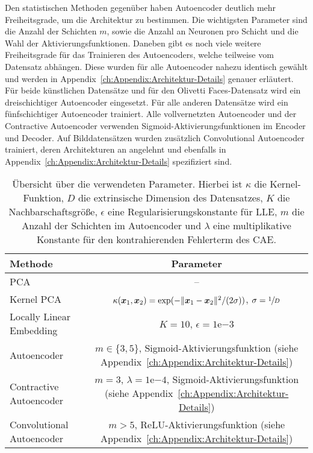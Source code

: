 Den statistischen Methoden gegenüber haben Autoencoder deutlich mehr Freiheitsgrade, um die
Architektur zu bestimmen. Die wichtigsten Parameter sind die Anzahl der Schichten $m$, sowie die
Anzahl an Neuronen pro Schicht und die Wahl der Aktivierungsfunktionen. Daneben gibt es noch viele
weitere Freiheitsgrade für das Trainieren des Autoencoders, welche teilweise vom Datensatz
abhängen. Diese wurden für alle Autoencoder nahezu identisch gewählt und werden in
Appendix~\ref{ch:Appendix:Architektur-Details} genauer erläutert. Für beide künstlichen Datensätze
und für den Olivetti Faces-Datensatz wird ein dreischichtiger
Autoencoder eingesetzt. Für alle anderen Datensätze wird ein fünfschichtiger Autoencoder trainiert.
Alle vollvernetzten Autoencoder und der Contractive Autoencoder verwenden
Sigmoid-Aktivierungsfunktionen im Encoder und Decoder. Auf Bilddatensätzen wurden zusätzlich
Convolutional Autoencoder trainiert, deren Architekturen an \textcite[14]{Ghosh.2019} angelehnt und
ebenfalls in Appendix~\ref{ch:Appendix:Architektur-Details} spezifiziert sind.

\begin{table}[ht]
	\tymax=300pt
	\centering
	\begin{tabulary}{\textwidth}{LC}
		\toprule
		Methode                            & Parameter                                                            \\ \midrule
		PCA      & --                                                                   \\
		Kernel PCA                         & $\kappa(\bm{x}_1, \bm{x}_2) = \exp(- \lVert\bm{x}_1 - \bm{x}_2\rVert^2/(2\sigma))$, $\sigma=\sfrac{1}{D}$ \\
		Locally Linear Embedding     & $K=10$, $\epsilon=1\mathrm{e}{-3}$                                   \\
		Autoencoder                  & $m \in \{3, 5\}$, Sigmoid-Aktivierungsfunktion \newline (siehe
		Appendix~\ref{ch:Appendix:Architektur-Details})                                                           \\  Contractive Autoencoder & $m = 3$, $\lambda=1\mathrm{e}{-4}$,
		Sigmoid-Aktivierungsfunktion (siehe Appendix~\ref{ch:Appendix:Architektur-Details})                       \\
		Convolutional Autoencoder & $m > 5$, ReLU-Aktivierungsfunktion \newline (siehe
		Appendix~\ref{ch:Appendix:Architektur-Details})                                                           \\ \bottomrule
	\end{tabulary}
	\caption[Übersicht über die verwendeten Parameter der Methoden]{Übersicht über die verwendeten Parameter. Hierbei ist $\kappa$ die Kernel-Funktion, $D$ die extrinsische Dimension des Datensatzes, $K$ die Nachbarschaftsgröße, $\epsilon$ eine Regularisierungskonstante für LLE, $m$ die Anzahl der Schichten im Autoencoder und $\lambda$ eine multiplikative Konstante für den kontrahierenden Fehlerterm des CAE.}
	\label{tab:uebersicht-parameter}
\end{table}
